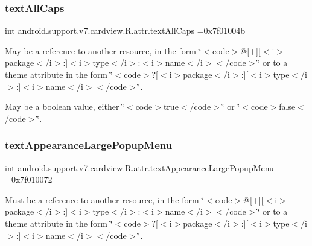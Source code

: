 \subsubsection{\texorpdfstring{text\+All\+Caps}{textAllCaps}}
{\footnotesize\ttfamily int android.\+support.\+v7.\+cardview.\+R.\+attr.\+text\+All\+Caps =0x7f01004b\hspace{0.3cm}{\ttfamily [static]}}

May be a reference to another resource, in the form \char`\"{}$<$code$>$@\mbox{[}+\mbox{]}\mbox{[}$<$i$>$package$<$/i$>$\+:\mbox{]}$<$i$>$type$<$/i$>$\+:$<$i$>$name$<$/i$>$$<$/code$>$\char`\"{} or to a theme attribute in the form \char`\"{}$<$code$>$?\mbox{[}$<$i$>$package$<$/i$>$\+:\mbox{]}\mbox{[}$<$i$>$type$<$/i$>$\+:\mbox{]}$<$i$>$name$<$/i$>$$<$/code$>$\char`\"{}. 

May be a boolean value, either \char`\"{}$<$code$>$true$<$/code$>$\char`\"{} or \char`\"{}$<$code$>$false$<$/code$>$\char`\"{}. \mbox{\label{classandroid_1_1support_1_1v7_1_1cardview_1_1R_1_1attr_ae017936149061e07ad19fbf80ad512c0}} 
\subsubsection{\texorpdfstring{text\+Appearance\+Large\+Popup\+Menu}{textAppearanceLargePopupMenu}}
{\footnotesize\ttfamily int android.\+support.\+v7.\+cardview.\+R.\+attr.\+text\+Appearance\+Large\+Popup\+Menu =0x7f010072\hspace{0.3cm}{\ttfamily [static]}}

Must be a reference to another resource, in the form \char`\"{}$<$code$>$@\mbox{[}+\mbox{]}\mbox{[}$<$i$>$package$<$/i$>$\+:\mbox{]}$<$i$>$type$<$/i$>$\+:$<$i$>$name$<$/i$>$$<$/code$>$\char`\"{} or to a theme attribute in the form \char`\"{}$<$code$>$?\mbox{[}$<$i$>$package$<$/i$>$\+:\mbox{]}\mbox{[}$<$i$>$type$<$/i$>$\+:\mbox{]}$<$i$>$name$<$/i$>$$<$/code$>$\char`\"{}. \mbox{\label{classandroid_1_1support_1_1v7_1_1cardview_1_1R_1_1attr_a504a1e2232cabe69718c28f8f8e1f022}} 
